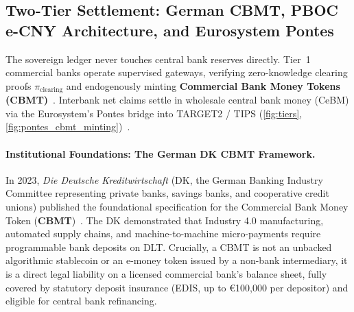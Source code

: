 \documentclass[a4paper,11pt,twoside,parskip=half-,headings=small]{scrartcl}
\begin{document}
\subsection{Two-Tier Settlement: German CBMT, PBOC e-CNY Architecture, and Eurosystem Pontes}
\label{sec:cbmt_pontes_comparison}

The sovereign ledger never touches central bank reserves directly. Tier~1 commercial
banks operate supervised gateways, verifying zero-knowledge clearing proofs
$\pi_{\text{clearing}}$ and endogenously minting \textbf{Commercial Bank Money Tokens (CBMT)}~\cite{dk2023cbmt}.
Interbank net claims settle in wholesale central bank money (CeBM) via the Eurosystem's Pontes
bridge into TARGET2 / TIPS (\cref{fig:tiers}, \cref{fig:pontes_cbmt_minting})~\cite{ecbpontes}.

\paragraph{Institutional Foundations: The German DK CBMT Framework.}
In 2023, \emph{Die Deutsche Kreditwirtschaft} (DK, the German Banking Industry Committee representing private banks, savings banks, and cooperative credit unions) published the foundational specification for the Commercial Bank Money Token (\textbf{CBMT})~\cite{dk2023cbmt}. The DK demonstrated that Industry 4.0 manufacturing, automated supply chains, and machine-to-machine micro-payments require programmable bank deposits on DLT. Crucially, a CBMT is not an unbacked algorithmic stablecoin or an e-money token issued by a non-bank intermediary, it is a direct legal liability on a licensed commercial bank's balance sheet, fully covered by statutory deposit insurance (EDIS, up to €100,000 per depositor) and eligible for central bank refinancing.
\end{document}
